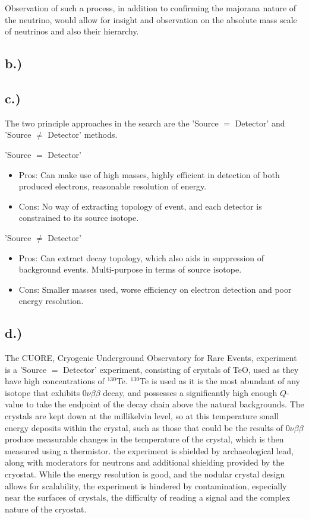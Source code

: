 \documentclass[]{article}
\begin{document}
			Observation of such a process, in addition to confirming the majorana nature of the neutrino, would allow for insight and observation on the absolute mass scale of neutrinos and also their hierarchy.
			
		\subsection{b.) }
		\newpage
		
		\subsection{c.) }
		
		The two principle approaches in the search are the 'Source $=$ Detector' and 'Source $\neq$ Detector' methods.
		
		'Source $=$ Detector'
		\begin{itemize}
			\item Pros: Can make use of high masses, highly efficient in detection of both produced electrons, reasonable resolution of energy.
			\item Cons: No way of extracting topology of event, and each detector is constrained to its source isotope.
		\end{itemize}
		
		'Source $\neq$ Detector'
		\begin{itemize}
			\item Pros: Can extract decay topology, which also aids in suppression of background events. Multi-purpose in terms of source isotope. 
			\item Cons: Smaller masses used, worse efficiency on electron detection and poor energy resolution.
		\end{itemize}
		
		\subsection{d.) }
		The CUORE, Cryogenic Underground Observatory for Rare Events, experiment is a 		'Source $=$ Detector' experiment, consisting of crystals of TeO, used as they have high concentrations of $^{130}$Te.  $^{130}$Te is used as it is the most abundant of any isotope that exhibits $0\nu\beta\beta$ decay, and possesses a significantly high enough $Q$-value to take the endpoint of the decay chain above the natural backgrounds. The crystals are kept down at the millikelvin level, so at this temperature small energy deposits within the crystal, such as those that could be the results of $0\nu\beta\beta$ produce measurable changes in the temperature of the crystal, which is then measured using a thermistor. the experiment is shielded by archaeological lead, along with moderators for neutrons and additional shielding provided by the cryostat. While the energy resolution is good, and the nodular crystal design allows for scalability, the experiment is hindered by contamination, especially near the surfaces of crystals, the difficulty of reading a signal and the complex nature of the cryostat.
		
\end{document}
